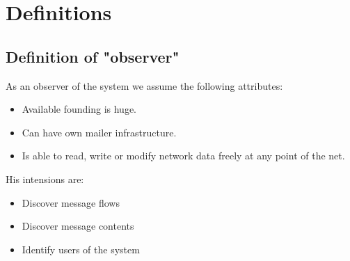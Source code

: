 \documentclass[12pt,journal,compsoc]{IEEEtran}
\begin{document}
%


\appendices
\section{Definitions}\label{app:definitions}
\subsection{Definition of "observer"}
As an observer of the system we assume the following attributes:
\begin{itemize}
	\item Available founding is huge.
	\item Can have own mailer infrastructure.
	\item Is able to read, write or modify network data freely at any point of the net.
\end{itemize}
His intensions are:
\begin{itemize}
	\item Discover message flows
	\item Discover message contents
	\item Identify users of the system
\end{itemize}
\end{document}
